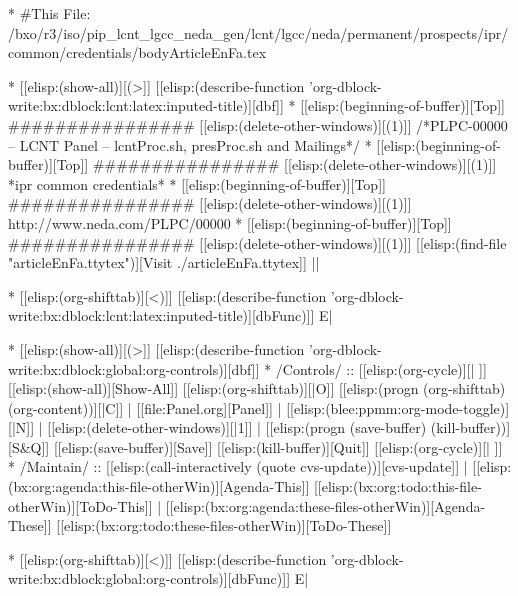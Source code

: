 
\begin{whenOrg}
*  #This File: /bxo/r3/iso/pip_lcnt_lgcc_neda_gen/lcnt/lgcc/neda/permanent/prospects/ipr/common/credentials/bodyArticleEnFa.tex
\end{whenOrg}

\begin{whenOrg}
* [[elisp:(show-all)][(>]] [[elisp:(describe-function 'org-dblock-write:bx:dblock:lcnt:latex:inputed-title)][dbf]]
*  [[elisp:(beginning-of-buffer)][Top]] ################  [[elisp:(delete-other-windows)][(1)]]   /*PLPC-00000 -- LCNT Panel -- lcntProc.sh, presProc.sh and Mailings*/
*  [[elisp:(beginning-of-buffer)][Top]] ################  [[elisp:(delete-other-windows)][(1)]]   *ipr common credentials*
*  [[elisp:(beginning-of-buffer)][Top]] ################  [[elisp:(delete-other-windows)][(1)]]   http://www.neda.com/PLPC/00000
*  [[elisp:(beginning-of-buffer)][Top]] ################  [[elisp:(delete-other-windows)][(1)]]   [[elisp:(find-file "articleEnFa.ttytex")][Visit ./articleEnFa.ttytex]] ||

* [[elisp:(org-shifttab)][<)]] [[elisp:(describe-function 'org-dblock-write:bx:dblock:lcnt:latex:inputed-title)][dbFunc)]]  E|
\end{whenOrg}

\begin{whenOrg}
* [[elisp:(show-all)][(>]] [[elisp:(describe-function 'org-dblock-write:bx:dblock:global:org-controls)][dbf]]
*  /Controls/ ::  [[elisp:(org-cycle)][| ]]  [[elisp:(show-all)][Show-All]]  [[elisp:(org-shifttab)][|O]]  [[elisp:(progn (org-shifttab) (org-content))][|C]] | [[file:Panel.org][Panel]] | [[elisp:(blee:ppmm:org-mode-toggle)][|N]] | [[elisp:(delete-other-windows)][|1]] | [[elisp:(progn (save-buffer) (kill-buffer))][S&Q]]  [[elisp:(save-buffer)][Save]]  [[elisp:(kill-buffer)][Quit]] [[elisp:(org-cycle)][| ]]
*  /Maintain/ ::  [[elisp:(call-interactively (quote cvs-update))][cvs-update]] | [[elisp:(bx:org:agenda:this-file-otherWin)][Agenda-This]] [[elisp:(bx:org:todo:this-file-otherWin)][ToDo-This]] | [[elisp:(bx:org:agenda:these-files-otherWin)][Agenda-These]] [[elisp:(bx:org:todo:these-files-otherWin)][ToDo-These]]

* [[elisp:(org-shifttab)][<)]] [[elisp:(describe-function 'org-dblock-write:bx:dblock:global:org-controls)][dbFunc)]]  E|
\end{whenOrg}

